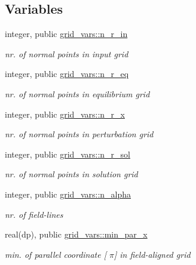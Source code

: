 \subsection*{Variables}
\begin{DoxyCompactItemize}
\item 
integer, public \hyperlink{namespacegrid__vars_ad1047cc6f07720d61c8e6fdc3c68a317}{grid\+\_\+vars\+::n\+\_\+r\+\_\+in}
\begin{DoxyCompactList}\small\item\em nr. of normal points in input grid \end{DoxyCompactList}\item 
integer, public \hyperlink{namespacegrid__vars_aa3785d71892d3d7db81aca0b6aa880b0}{grid\+\_\+vars\+::n\+\_\+r\+\_\+eq}
\begin{DoxyCompactList}\small\item\em nr. of normal points in equilibrium grid \end{DoxyCompactList}\item 
integer, public \hyperlink{namespacegrid__vars_abee8a41de92fe25b2d3dfaf472b02cd2}{grid\+\_\+vars\+::n\+\_\+r\+\_\+x}
\begin{DoxyCompactList}\small\item\em nr. of normal points in perturbation grid \end{DoxyCompactList}\item 
integer, public \hyperlink{namespacegrid__vars_ad998db12a656afb94d2d54a7d0eca642}{grid\+\_\+vars\+::n\+\_\+r\+\_\+sol}
\begin{DoxyCompactList}\small\item\em nr. of normal points in solution grid \end{DoxyCompactList}\item 
integer, public \hyperlink{namespacegrid__vars_a83a6486b23c4a218822540da15904426}{grid\+\_\+vars\+::n\+\_\+alpha}
\begin{DoxyCompactList}\small\item\em nr. of field-\/lines \end{DoxyCompactList}\item 
real(dp), public \hyperlink{namespacegrid__vars_a689c08cf03bc54338878f85c6429b856}{grid\+\_\+vars\+::min\+\_\+par\+\_\+x}
\begin{DoxyCompactList}\small\item\em min. of parallel coordinate \mbox{[} $\pi$\mbox{]} in field-\/aligned grid \end{DoxyCompactList}\item 

\end{DoxyCompactItemize}
